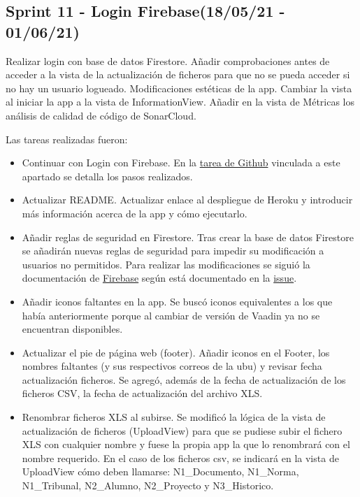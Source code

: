 
\subsection{Sprint 11 - Login Firebase(18/05/21 - 01/06/21)}
Realizar login con base de datos Firestore. Añadir comprobaciones antes de acceder a la vista de la actualización de ficheros para que no se pueda acceder si no hay un usuario logueado. Modificaciones estéticas de la app. Cambiar la vista al iniciar la app a la vista de InformationView. Añadir en la vista de Métricas los análisis de calidad de código de SonarCloud.

Las tareas realizadas fueron:
\begin{itemize}
	\item Continuar con Login con Firebase.
		En la \href{https://github.com/dbo1001/Gestor-TFG-2021/issues/122}{tarea de Github} vinculada a este apartado se detalla los pasos realizados.
	\item Actualizar README.
		Actualizar enlace al despliegue de Heroku y introducir más información acerca de la app y cómo ejecutarlo.
	\item Añadir reglas de seguridad en Firestore.
		Tras crear la base de datos Firestore se añadirán nuevas reglas de seguridad para impedir su modificación a usuarios no permitidos. Para realizar las modificaciones se siguió la documentación de \href{https://firebase.google.com/docs/firestore/security/insecure-rules}{Firebase} según está documentado en la \href{https://github.com/dbo1001/Gestor-TFG-2021/issues/130}{issue}.
	\item Añadir iconos faltantes en la app.
		Se buscó iconos equivalentes a los que había anteriormente porque al cambiar de versión de Vaadin ya no se encuentran disponibles.
	\item Actualizar el pie de página web (footer).
		Añadir iconos en el Footer, los nombres faltantes (y sus respectivos correos de la ubu) y revisar fecha actualización ficheros. Se agregó, además de la fecha de actualización de los ficheros CSV, la fecha de actualización del archivo XLS.
	\item Renombrar ficheros XLS al subirse.
		Se modificó la lógica de la vista de actualización de ficheros (UploadView) para que se pudiese subir el fichero XLS con cualquier nombre y fuese la propia app la que lo renombrará con el nombre requerido. En el caso de los ficheros csv, se indicará en la vista de UploadView cómo deben llamarse: N1\_Documento, N1\_Norma, N1\_Tribunal, N2\_Alumno, N2\_Proyecto y N3\_Historico.

\end{itemize}
